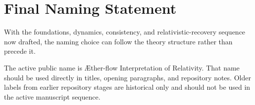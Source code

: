 \documentclass[11pt]{article}
\newcommand{\Aflow}{\AE{}ther-flow}
\newcommand{\TheoryName}{\Aflow{} Interpretation of Relativity}
\begin{document}
\section{Final Naming Statement}

With the foundations, dynamics, consistency, and relativistic-recovery sequence now drafted, the naming choice can follow the theory structure rather than precede it.

The active public name is \TheoryName{}. That name should be used directly in titles, opening paragraphs, and repository notes. Older labels from earlier repository stages are historical only and should not be used in the active manuscript sequence.


\end{document}

